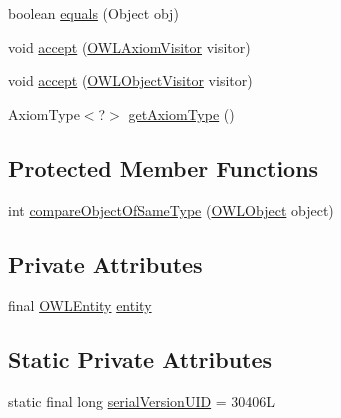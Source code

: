 \begin{DoxyCompactItemize}
boolean \hyperlink{classuk_1_1ac_1_1manchester_1_1cs_1_1owl_1_1owlapi_1_1_o_w_l_declaration_axiom_impl_acf4cbffe39d07b06127a007934253e9a}{equals} (Object obj)
\item 
void \hyperlink{classuk_1_1ac_1_1manchester_1_1cs_1_1owl_1_1owlapi_1_1_o_w_l_declaration_axiom_impl_a8f59ee47124517a816216b490de80ebb}{accept} (\hyperlink{interfaceorg_1_1semanticweb_1_1owlapi_1_1model_1_1_o_w_l_axiom_visitor}{O\-W\-L\-Axiom\-Visitor} visitor)
\item 
void \hyperlink{classuk_1_1ac_1_1manchester_1_1cs_1_1owl_1_1owlapi_1_1_o_w_l_declaration_axiom_impl_a583b0cf72ea8ced92f890318383d3585}{accept} (\hyperlink{interfaceorg_1_1semanticweb_1_1owlapi_1_1model_1_1_o_w_l_object_visitor}{O\-W\-L\-Object\-Visitor} visitor)
\item 
Axiom\-Type$<$?$>$ \hyperlink{classuk_1_1ac_1_1manchester_1_1cs_1_1owl_1_1owlapi_1_1_o_w_l_declaration_axiom_impl_a4d47f8f19323037a82cf3e93de7ac784}{get\-Axiom\-Type} ()
\end{DoxyCompactItemize}
\subsection*{Protected Member Functions}
\begin{DoxyCompactItemize}
\item 
int \hyperlink{classuk_1_1ac_1_1manchester_1_1cs_1_1owl_1_1owlapi_1_1_o_w_l_declaration_axiom_impl_a7e45c002172de86e714f073510791f9c}{compare\-Object\-Of\-Same\-Type} (\hyperlink{interfaceorg_1_1semanticweb_1_1owlapi_1_1model_1_1_o_w_l_object}{O\-W\-L\-Object} object)
\end{DoxyCompactItemize}
\subsection*{Private Attributes}
\begin{DoxyCompactItemize}
\item 
final \hyperlink{interfaceorg_1_1semanticweb_1_1owlapi_1_1model_1_1_o_w_l_entity}{O\-W\-L\-Entity} \hyperlink{classuk_1_1ac_1_1manchester_1_1cs_1_1owl_1_1owlapi_1_1_o_w_l_declaration_axiom_impl_ad670ccd08ef4703402bd77ec5ff9348f}{entity}
\end{DoxyCompactItemize}
\subsection*{Static Private Attributes}
\begin{DoxyCompactItemize}
\item 
static final long \hyperlink{classuk_1_1ac_1_1manchester_1_1cs_1_1owl_1_1owlapi_1_1_o_w_l_declaration_axiom_impl_af016ff11b3e65d0e97bef762e127afc3}{serial\-Version\-U\-I\-D} = 30406\-L
\end{DoxyCompactItemize}
